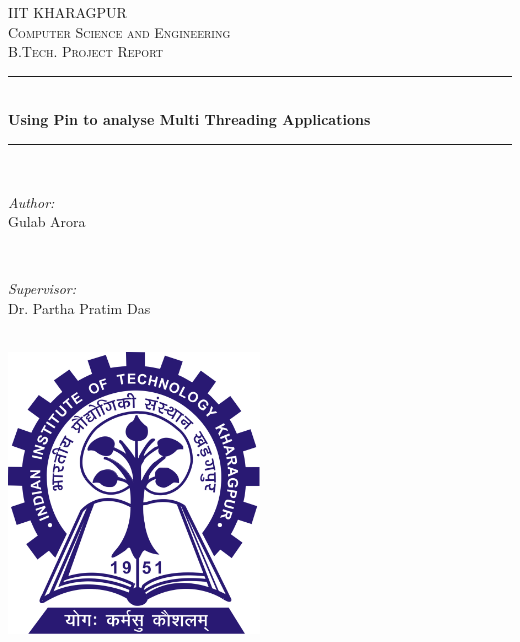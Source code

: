 \begin{titlepage}

\newcommand{\HRule}{\rule{\linewidth}{0.5mm}} %
\centering%
\textsc{\LARGE IIT KHARAGPUR}\\[1cm] %
\textsc{\Large Computer Science and Engineering}\\[0.5cm] %
\textsc{\large B.Tech. Project Report}\\[0.5cm] %
\HRule \\[0.4cm]
{ \huge \bfseries Using Pin to analyse Multi Threading Applications}  \\[0.4cm] %
\HRule \\[0.5cm]
\begin{minipage}{0.4\textwidth}
\begin{flushleft} \large
\emph{Author:}\\
Gulab Arora
\end{flushleft}
\end{minipage}
~
\begin{minipage}{0.4\textwidth}
\begin{flushright} \large
\emph{Supervisor:} \\
Dr. Partha Pratim Das %
\end{flushright}
\end{minipage}\\[2cm]
\includegraphics[width=0.5\textwidth]{IIT_Kharagpur_Logo_svg.png} %

\vfill %
\end{titlepage}
